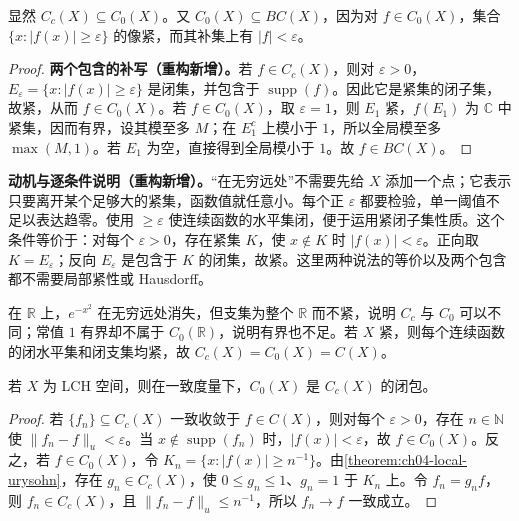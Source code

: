 \documentclass[../../main.tex]{subfiles}%
\begin{document}
\begin{proposition}\label{proposition:ch04-cc-czero-bc}
显然 $C_c(X)\subseteq C_0(X)$。又 $C_0(X)\subseteq BC(X)$，因为对 $f\in C_0(X)$，集合 $\{x:|f(x)|\ge\varepsilon\}$ 的像紧，而其补集上有 $|f|<\varepsilon$。
\end{proposition}
\begin{proof}
\textbf{两个包含的补写（重构新增）。}若 $f\in C_c(X)$，则对 $\varepsilon>0$，$E_\varepsilon=\{x:|f(x)|\ge\varepsilon\}$ 是闭集，并包含于 $\operatorname{supp}(f)$。因此它是紧集的闭子集，故紧，从而 $f\in C_0(X)$。若 $f\in C_0(X)$，取 $\varepsilon=1$，则 $E_1$ 紧，$f(E_1)$ 为 $\mathbb C$ 中紧集，因而有界，设其模至多 $M$；在 $E_1^c$ 上模小于 $1$，所以全局模至多 $\max(M,1)$。若 $E_1$ 为空，直接得到全局模小于 $1$。故 $f\in BC(X)$。
\end{proof}
\begin{remark}
\textbf{动机与逐条件说明（重构新增）。}“在无穷远处”不需要先给 $X$ 添加一个点；它表示只要离开某个足够大的紧集，函数值就任意小。每个正 $\varepsilon$ 都要检验，单一阈值不足以表达趋零。使用 $\ge\varepsilon$ 使连续函数的水平集闭，便于运用紧闭子集性质。这个条件等价于：对每个 $\varepsilon>0$，存在紧集 $K$，使 $x\notin K$ 时 $|f(x)|<\varepsilon$。正向取 $K=E_\varepsilon$；反向 $E_\varepsilon$ 是包含于 $K$ 的闭集，故紧。这里两种说法的等价以及两个包含都不需要局部紧性或 Hausdorff。

在 $\mathbb R$ 上，$e^{-x^2}$ 在无穷远处消失，但支集为整个 $\mathbb R$ 而不紧，说明 $C_c$ 与 $C_0$ 可以不同；常值 $1$ 有界却不属于 $C_0(\mathbb R)$，说明有界也不足。若 $X$ 紧，则每个连续函数的闭水平集和闭支集均紧，故 $C_c(X)=C_0(X)=C(X)$。
\end{remark}
\begin{proposition}\label{proposition:ch04-cc-dense-czero}
若 $X$ 为 LCH 空间，则在一致度量下，$C_0(X)$ 是 $C_c(X)$ 的闭包。
\end{proposition}
\begin{proof}
若 $\{f_n\}\subseteq C_c(X)$ 一致收敛于 $f\in C(X)$，则对每个 $\varepsilon>0$，存在 $n\in\mathbb N$ 使 $\|f_n-f\|_u<\varepsilon$。当 $x\notin\operatorname{supp}(f_n)$ 时，$|f(x)|<\varepsilon$，故 $f\in C_0(X)$。反之，若 $f\in C_0(X)$，令 $K_n=\{x:|f(x)|\ge n^{-1}\}$。由\cref{theorem:ch04-local-urysohn}，存在 $g_n\in C_c(X)$，使 $0\le g_n\le1$、$g_n=1$ 于 $K_n$ 上。令 $f_n=g_nf$，则 $f_n\in C_c(X)$，且 $\|f_n-f\|_u\le n^{-1}$，所以 $f_n\to f$ 一致成立。
\end{proof}
\end{document}
